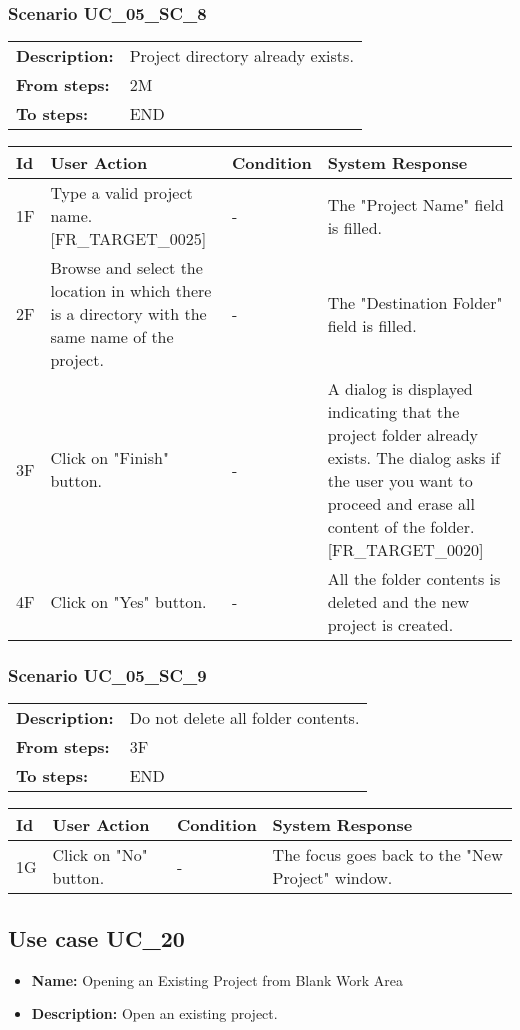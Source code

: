 \documentclass[a4paper,11pt]{article}
\newcommand{\bl}{\\ \hline}
\begin{document}
\subsubsection*{Scenario UC_05_SC_8}
\begin{tabular}{p{1in}p{4in}}
{\bf Description:} & Project directory already exists. \\
{\bf From steps:} & 2M \\
{\bf To steps:} & END \\
\end{tabular}
 
\begin{tabular}{|p{0.8in}|p{1.6in}|p{1.6in}|p{1.6in}|}
\hline
Id & User Action & Condition & System Response  \bl 
1F & Type a valid project name. [FR_TARGET_0025] & - & The "Project Name" field is filled. \bl 
2F & Browse and select the location in which there is a directory with the same name of the project. & - & The "Destination Folder" field is filled. \bl 
3F & Click on "Finish" button. & - & A dialog is displayed indicating that the project folder already exists. The dialog asks if the user you want to proceed and erase all content of the folder. [FR_TARGET_0020] \bl 
4F & Click on "Yes" button. & - & All the folder contents is deleted and the new project is created. \bl 
\end{tabular}
\subsubsection*{Scenario UC_05_SC_9}
\begin{tabular}{p{1in}p{4in}}
{\bf Description:} & Do not delete all folder contents. \\
{\bf From steps:} & 3F \\
{\bf To steps:} & END \\
\end{tabular}
 
\begin{tabular}{|p{0.8in}|p{1.6in}|p{1.6in}|p{1.6in}|}
\hline
Id & User Action & Condition & System Response  \bl 
1G & Click on "No" button. & - & The focus goes back to the "New Project" window. \bl 
\end{tabular}
\subsection*{Use case UC_20}
\begin{itemize}
\item {\bf Name: }Opening an Existing Project from Blank Work Area
\item {\bf Description: }Open an existing project.
\end{itemize}
\end{document}
